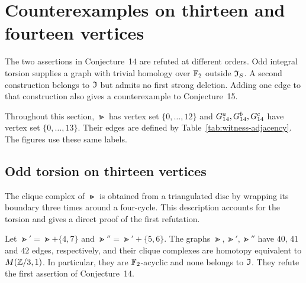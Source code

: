 \section{Counterexamples on thirteen and fourteen vertices}\label{sec:examples}

The two assertions in Conjecture~14 are refuted at different orders.
Odd integral torsion supplies a graph with trivial homology over
$\mathbb F_2$ outside $\mathfrak I_S$. A second construction belongs to $\mathfrak I$ but admits
no first strong deletion. Adding one edge to that construction also
gives a counterexample to Conjecture~15.

Throughout this section, $\Gt$ has vertex set $\{0,\ldots,12\}$ and
$G_{14}^{a},G_{14}^{b},G_{14}^{c}$ have vertex set $\{0,\ldots,13\}$. Their edges are defined
by Table~\ref{tab:witness-adjacency}. The figures use these same labels.

\subsection{Odd torsion on thirteen vertices}\label{sec:thirteen}

The clique complex of $\Gt$ is obtained from a triangulated disc by
wrapping its boundary three times around a four-cycle. This description accounts
for the torsion and gives a direct proof of the first refutation.

\begin{theorem}\label{thm:A}
Let $\Gt'=\Gt+\{4,7\}$ and $\Gt''=\Gt'+\{5,6\}$.
The graphs $\Gt,\Gt',\Gt''$ have $40$, $41$ and $42$ edges, respectively,
and their clique complexes are homotopy equivalent to $M(\mathbb Z/3,1)$.
In particular, they are $\mathbb F_2$-acyclic and none belongs to $\mathfrak I$.
They refute the first assertion of Conjecture~14.
\end{theorem}

